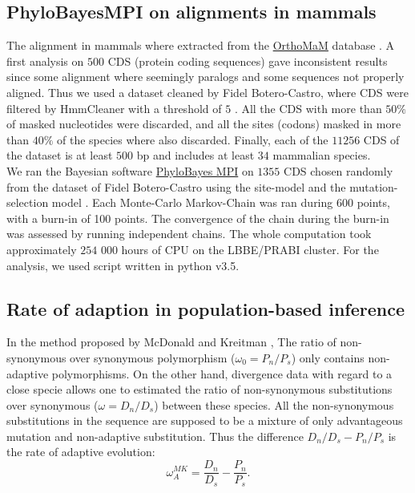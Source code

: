 \documentclass[10pt]{article}
\begin{document}
\begin{multicols}{2}
	\subsection*{PhyloBayesMPI on alignments in mammals}
	The alignment in mammals where extracted from the \href{http://www.orthomam.univ-montp2.fr}{OrthoMaM} database \cite{ranwez_orthomam:_2007, douzery_orthomam_2014}. A first analysis on $500$ CDS (protein coding sequences) gave inconsistent results since some alignment where seemingly paralogs and some sequences not properly aligned. Thus we used a dataset cleaned by Fidel Botero-Castro, where CDS were filtered by HmmCleaner with a threshold of $5$ \cite{di_franco_detecting_2017}. All the CDS with more than $50\%$ of masked nucleotides were discarded, and all the sites (codons) masked in more than $40\%$ of the species where also discarded. Finally, each of the $11256$ CDS of the dataset is at least $500$ bp and includes at least $34$ mammalian species. \\
	
	We ran the Bayesian software \href{https://github.com/bayesiancook/pbmpi2}{PhyloBayes MPI} on $1355$ CDS chosen randomly from the dataset of Fidel Botero-Castro using the site-model \cite{lartillot_phylobayes_2013} and the mutation-selection model \cite{rodrigue_site-heterogeneous_2014}. Each Monte-Carlo Markov-Chain was ran during $600$ points, with a burn-in of 100 points. The convergence of the chain during the burn-in was assessed by running independent chains.  The whole computation took approximately $254$ $000$ hours of CPU on the LBBE/PRABI cluster. For the analysis, we used script written in python v3.5.
	
	\subsection*{Rate of adaption in population-based inference}
	In the method proposed by McDonald and Kreitman \cite{McDonald1991}, The ratio of non-synonymous over synonymous polymorphism ($\omega_{0}=P_n/P_s$) only contains non-adaptive polymorphisms. On the other hand, divergence data with regard to a close specie allows one to estimated the ratio of non-synonymous substitutions over synonymous ($\omega=D_n/D_s$) between these species. All the non-synonymous substitutions in the sequence are supposed to be a mixture of only advantageous mutation and non-adaptive substitution. Thus the difference $D_n/D_s - P_n/P_s$ is the rate of adaptive evolution:
	\begin{equation*}
	\omega_A^{MK}=\dfrac{D_n}{D_s} - \dfrac{P_n}{P_s}.
	\end{equation*}
	


\end{multicols}
\end{document}
